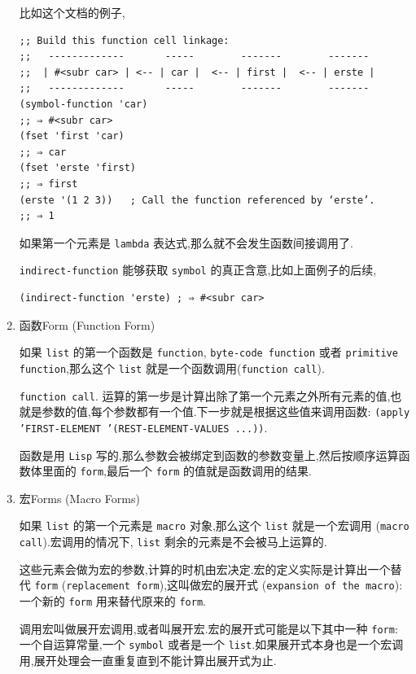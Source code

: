 \documentclass[11pt]{article}
\begin{document}
\begin{enumerate}
比如这个文档的例子,

\begin{verbatim}
;; Build this function cell linkage:
;;   -------------       -----        -------        -------
;;  | #<subr car> | <-- | car |  <-- | first |  <-- | erste |
;;   -------------       -----        -------        -------
(symbol-function 'car)
;; ⇒ #<subr car>
(fset 'first 'car)
;; ⇒ car
(fset 'erste 'first)
;; ⇒ first
(erste '(1 2 3))   ; Call the function referenced by ‘erste’.
;; ⇒ 1
\end{verbatim}

如果第一个元素是 \texttt{lambda} 表达式,那么就不会发生函数间接调用了.

\texttt{indirect-function} 能够获取 \texttt{symbol} 的真正含意,比如上面例子的后续,

\begin{verbatim}
(indirect-function 'erste) ; ⇒ #<subr car>
\end{verbatim}


\item 函数Form (Function Form)
\label{sec:org5e3bc5d}

如果 \texttt{list} 的第一个函数是 \texttt{function}, \texttt{byte-code function} 或者 \texttt{primitive function},那么这个 \texttt{list} 就是一个函数调用(\texttt{function call}).

\texttt{function call}. 运算的第一步是计算出除了第一个元素之外所有元素的值,也就是参数的值,每个参数都有一个值.下一步就是根据这些值来调用函数: \texttt{(apply 'FIRST-ELEMENT '(REST-ELEMENT-VALUES ...))}.

函数是用 \texttt{Lisp} 写的,那么参数会被绑定到函数的参数变量上,然后按顺序运算函数体里面的 \texttt{form},最后一个 \texttt{form} 的值就是函数调用的结果.


\item 宏Forms (Macro Forms)
\label{sec:orgacc3cfc}

如果 \texttt{list} 的第一个元素是 \texttt{macro} 对象,那么这个 \texttt{list} 就是一个宏调用 (\texttt{macro call}).宏调用的情况下, \texttt{list} 剩余的元素是不会被马上运算的.

这些元素会做为宏的参数,计算的时机由宏决定.宏的定义实际是计算出一个替代 \texttt{form} (\texttt{replacement form}),这叫做宏的展开式 (\texttt{expansion of the macro}): 一个新的 \texttt{form} 用来替代原来的 \texttt{form}.

调用宏叫做展开宏调用,或者叫展开宏.宏的展开式可能是以下其中一种 \texttt{form}: 一个自运算常量,一个 \texttt{symbol} 或者是一个 \texttt{list}.如果展开式本身也是一个宏调用,展开处理会一直重复直到不能计算出展开式为止.


\end{enumerate}
\end{document}
